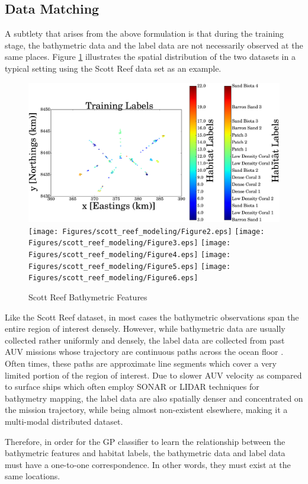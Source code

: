 		\subsection{Data Matching}
		\label{BenthicHabitatMapping:BathymetricFeatures:DataMatching}
		
			A subtlety that arises from the above formulation is that during the training stage, the bathymetric data and the label data are not necessarily observed at the same places. Figure \ref{Figure:ScottReefBathymetricFeatures} illustrates the spatial distribution of the two datasets in a typical setting using the Scott Reef data set \citep{IMOS} as an example.
		
			\begin{figure}[!htbp]
			\centering
				\includegraphics[width = 0.48\linewidth]{Figures/scott_reef_modeling/Figure1.eps}
				\texttt{[image: Figures/scott\_reef\_modeling/Figure2.eps]}
				\texttt{[image: Figures/scott\_reef\_modeling/Figure3.eps]}
				\texttt{[image: Figures/scott\_reef\_modeling/Figure4.eps]}
				\texttt{[image: Figures/scott\_reef\_modeling/Figure5.eps]}
				\texttt{[image: Figures/scott\_reef\_modeling/Figure6.eps]}
			\caption{Scott Reef Bathymetric Features}
			\label{Figure:ScottReefBathymetricFeatures}
			\end{figure}
			
			Like the Scott Reef dataset, in most cases the bathymetric observations span the entire region of interest densely. However, while bathymetric data are usually collected rather uniformly and densely, the label data are collected from past AUV missions whose trajectory are continuous paths across the ocean floor \citep{Squidle}. Often times, these paths are approximate line segments which cover a very limited portion of the region of interest. Due to slower AUV velocity as compared to surface ships which often employ SONAR or LIDAR techniques for bathymetry mapping, the label data are also spatially denser and concentrated on the mission trajectory, while being almost non-existent elsewhere, making it a multi-modal distributed dataset. 
			
			Therefore, in order for the GP classifier to learn the relationship between the bathymetric features and habitat labels, the bathymetric data and label data must have a one-to-one correspondence. In other words, they must exist at the same locations. 
			
